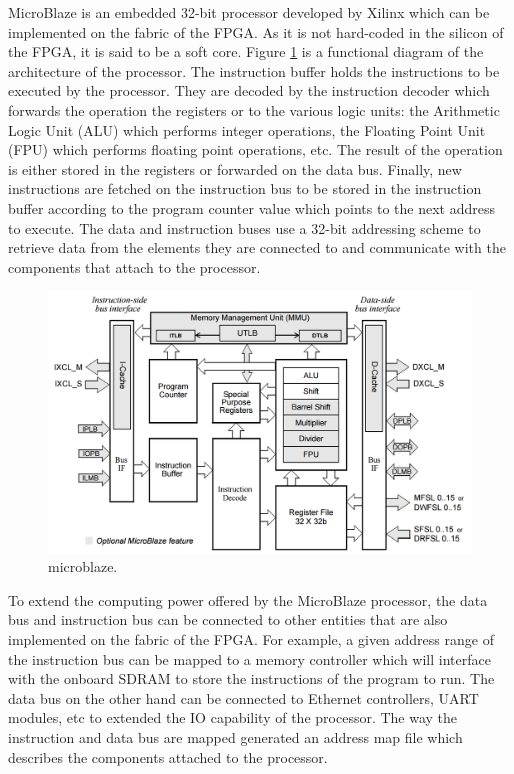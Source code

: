       MicroBlaze is an embedded 32-bit processor developed by Xilinx which can be implemented on the fabric of the FPGA. As it is not hard-coded in the silicon of the FPGA, it is said to be a soft core. Figure \ref{fig:III-1-microblaze} is a functional diagram of the architecture of the processor. The instruction buffer holds the instructions to be executed by the processor. They are decoded by the instruction decoder which forwards the operation the registers or to the various logic units: the Arithmetic Logic Unit (ALU) which performs integer operations, the Floating Point Unit (FPU) which performs floating point operations, etc. The result of the operation is either stored in the registers or forwarded on the data bus. Finally, new instructions are fetched on the instruction bus to be stored in the instruction buffer according to the program counter value which points to the next address to execute. The data and instruction buses use a 32-bit addressing scheme to retrieve data from the elements they are connected to and communicate with the components that attach to the processor. \\

      \begin{figure}[h!]
        \centering
        \includegraphics[width=\textwidth]{img/III-1-arch/microblaze.png}
        \caption{microblaze.}
        \label{fig:III-1-microblaze}
      \end{figure}

      To extend the computing power offered by the MicroBlaze processor, the data bus and instruction bus can be connected to other entities that are also implemented on the fabric of the FPGA. For example, a given address range of the instruction bus can be mapped to a memory controller which will interface with the onboard SDRAM to store the instructions of the program to run. The data bus on the other hand can be connected to Ethernet controllers, UART modules, etc to extended the IO capability of the processor. The way the instruction and data bus are mapped generated an address map file which describes the components attached to the processor. \\

